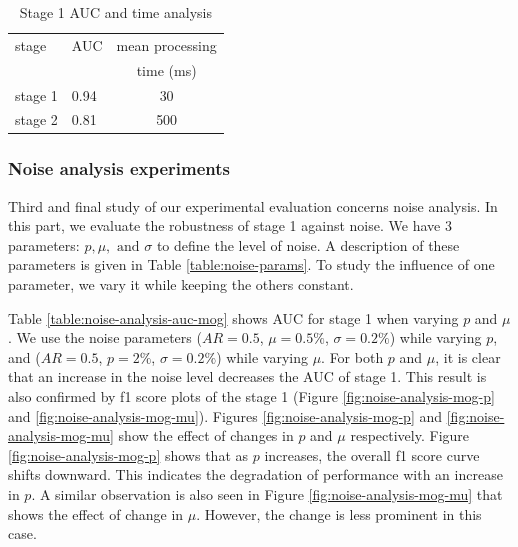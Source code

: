 \begin{table}
\centering
\caption{Stage 1 AUC and time analysis} \vspace{5pt}
\label{table:auc-time-analysis-s1}
\begin{tabular}{|l|l|c|}
\hline
stage   	& AUC     & mean processing \\
            &         &  time (ms)  \\ \hline \hline
stage 1     & 0.94    & 30    \\
stage 2     & 0.81    & 500  \\ \hline
\end{tabular}
\end{table}

\vspace{5pt}
\subsubsection{Noise analysis experiments}
Third and final study of our experimental evaluation concerns noise analysis. In this part, we evaluate the robustness of stage 1 against noise. We have 3 parameters: $p, \mu, \text{ and } \sigma$ to define the level of noise. A description of these parameters is given in Table \ref{table:noise-params}. To study the influence of one parameter, we vary it while keeping the others constant. 

Table \ref{table:noise-analysis-auc-mog} shows AUC for stage 1 when varying $p$ and $\mu$. We use the noise parameters ($AR=0.5$, $\mu=0.5\%$, $\sigma=0.2\%$) while varying $p$, and ($AR=0.5$, $p=2\%$, $\sigma=0.2\%$) while varying $\mu$. For both $p$ and $\mu$, it is clear that an increase in the noise level decreases the AUC of stage 1.  This result is also confirmed by f1 score plots of the stage 1 (Figure \ref{fig:noise-analysis-mog-p} and \ref{fig:noise-analysis-mog-mu}). Figures \ref{fig:noise-analysis-mog-p} and \ref{fig:noise-analysis-mog-mu} show the effect of changes in $p$ and $\mu$ respectively. Figure \ref{fig:noise-analysis-mog-p} shows that as $p$ increases, the overall f1 score curve shifts downward. This indicates the degradation of performance with an increase in $p$. A similar observation is also seen in Figure \ref{fig:noise-analysis-mog-mu} that shows the effect of change in $\mu$. However, the change is less prominent in this case.  


